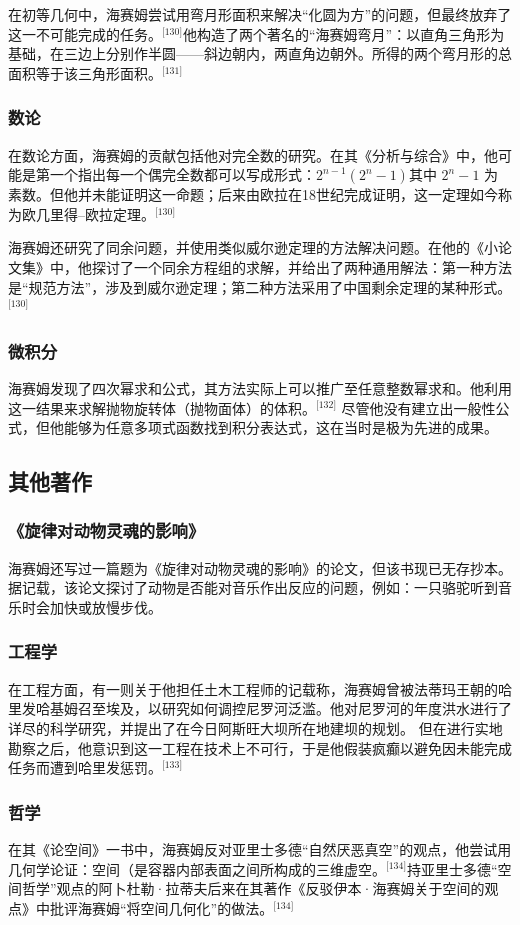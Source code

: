 在初等几何中，海赛姆尝试用弯月形面积来解决“化圆为方”的问题，但最终放弃了这一不可能完成的任务。\(^\text{[130]}\)他构造了两个著名的“海赛姆弯月”：以直角三角形为基础，在三边上分别作半圆——斜边朝内，两直角边朝外。所得的两个弯月形的总面积等于该三角形面积。\(^\text{[131]}\)
\subsubsection{数论}
在数论方面，海赛姆的贡献包括他对完全数的研究。在其《分析与综合》中，他可能是第一个指出每一个偶完全数都可以写成形式：$2^{n-1}(2^n - 1)$其中 $2^n - 1$ 为素数。但他并未能证明这一命题；后来由欧拉在18世纪完成证明，这一定理如今称为欧几里得–欧拉定理。\(^\text{[130]}\)

海赛姆还研究了同余问题，并使用类似威尔逊定理的方法解决问题。在他的《小论文集》中，他探讨了一个同余方程组的求解，并给出了两种通用解法：第一种方法是“规范方法”，涉及到威尔逊定理；第二种方法采用了中国剩余定理的某种形式。\(^\text{[130]}\)
\subsubsection{微积分}
海赛姆发现了四次幂求和公式，其方法实际上可以推广至任意整数幂求和。他利用这一结果来求解抛物旋转体（抛物面体）的体积。\(^\text{[132]}\)
尽管他没有建立出一般性公式，但他能够为任意多项式函数找到积分表达式，这在当时是极为先进的成果。
\subsection{其他著作}
\subsubsection{《旋律对动物灵魂的影响》}
海赛姆还写过一篇题为《旋律对动物灵魂的影响》的论文，但该书现已无存抄本。据记载，该论文探讨了动物是否能对音乐作出反应的问题，例如：一只骆驼听到音乐时会加快或放慢步伐。
\subsubsection{工程学}
在工程方面，有一则关于他担任土木工程师的记载称，海赛姆曾被法蒂玛王朝的哈里发哈基姆召至埃及，以研究如何调控尼罗河泛滥。他对尼罗河的年度洪水进行了详尽的科学研究，并提出了在今日阿斯旺大坝所在地建坝的规划。
但在进行实地勘察之后，他意识到这一工程在技术上不可行，于是他假装疯癫以避免因未能完成任务而遭到哈里发惩罚。\(^\text{[133]}\)
\subsubsection{哲学}
在其《论空间》一书中，海赛姆反对亚里士多德“自然厌恶真空”的观点，他尝试用几何学论证：空间（是容器内部表面之间所构成的三维虚空。\(^\text{[134]}\)持亚里士多德“空间哲学”观点的阿卜杜勒·拉蒂夫后来在其著作《反驳伊本·海赛姆关于空间的观点》中批评海赛姆“将空间几何化”的做法。\(^\text{[134]}\)

